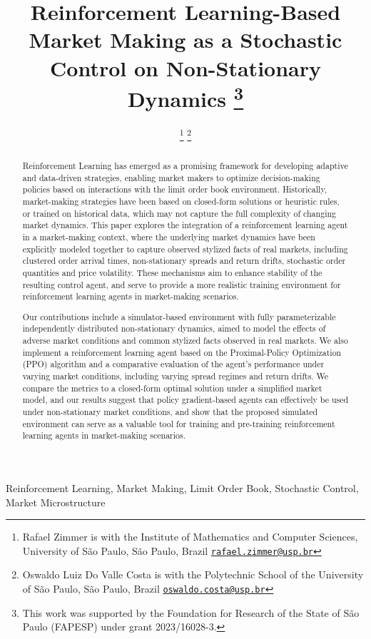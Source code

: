 \IEEEoverridecommandlockouts
\title{
    \LARGE
    \bfseries
    Reinforcement Learning-Based Market Making as a Stochastic Control on Non-Stationary Dynamics
    \thanks{This work was supported by the Foundation for Research of the State of São Paulo (FAPESP) under grant 2023/16028-3.}
}

\author{
    \thanks{Rafael Zimmer is with the Institute of Mathematics and Computer Sciences, University of São Paulo, São Paulo, Brazil \href{mailto:rafael.zimmer@usp.br}{\tt\small rafael.zimmer@usp.br}}
    \thanks{Oswaldo Luiz Do Valle Costa is with the Polytechnic School of the University of São Paulo, São Paulo, Brazil \href{mailto:mailto:oswaldo.costa@usp.br}{\tt\small oswaldo.costa@usp.br}}
}

\maketitle

\begin{abstract}
    Reinforcement Learning has emerged as a promising framework for developing adaptive and data-driven strategies,
    enabling market makers to optimize decision-making policies based on interactions with the limit order book environment.
    Historically, market-making strategies have been based on closed-form solutions or heuristic rules,
    or trained on historical data, which may not capture the full complexity of changing market dynamics.
    This paper explores the integration of a reinforcement learning agent in a market-making context,
    where the underlying market dynamics have been explicitly modeled together to capture observed stylized facts of real markets,
    including clustered order arrival times, non-stationary spreads and return drifts, stochastic order quantities and price volatility.
    These mechanisms aim to enhance stability of the resulting control agent,
    and serve to provide a more realistic training environment for reinforcement learning agents in market-making scenarios.

    Our contributions include a simulator-based environment with fully parameterizable independently distributed non-stationary dynamics,
    aimed to model the effects of adverse market conditions and common stylized facts observed in real markets.
    We also implement a reinforcement learning agent based on the Proximal-Policy Optimization (PPO) algorithm and a
    comparative evaluation of the agent's performance under varying market conditions, including varying spread regimes and return drifts.
    We compare the metrics to a closed-form optimal solution under a simplified market model,
    and our results suggest that policy gradient-based agents can effectively be used under non-stationary market conditions,
    and show that the proposed simulated environment can serve as a valuable tool for training and
    pre-training reinforcement learning agents in market-making scenarios.
\end{abstract}

\begin{IEEEkeywords}
    Reinforcement Learning, Market Making, Limit Order Book, Stochastic Control, Market Microstructure
\end{IEEEkeywords}
